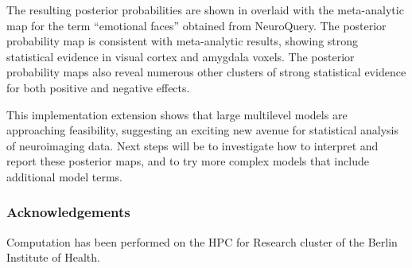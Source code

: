 \documentclass[../main.tex]{subfiles}
\begin{document}
The resulting posterior probabilities are shown in  overlaid with the meta-analytic map for the term ``emotional faces'' obtained from NeuroQuery\cite{dockes_neuroquery_2020}. The posterior probability map is consistent with meta-analytic results, showing strong statistical evidence in visual cortex and amygdala voxels. The posterior probability maps also reveal numerous other clusters of strong statistical evidence for both positive and negative effects. 

This implementation extension shows that large multilevel models are approaching feasibility, suggesting an exciting new avenue for statistical analysis of neuroimaging data. Next steps will be to investigate how to interpret and report these posterior maps, and to try more complex models that include additional model terms.

\subsubsection*{Acknowledgements}

Computation has been performed on the HPC for Research cluster of the Berlin Institute of Health.
\end{document}
